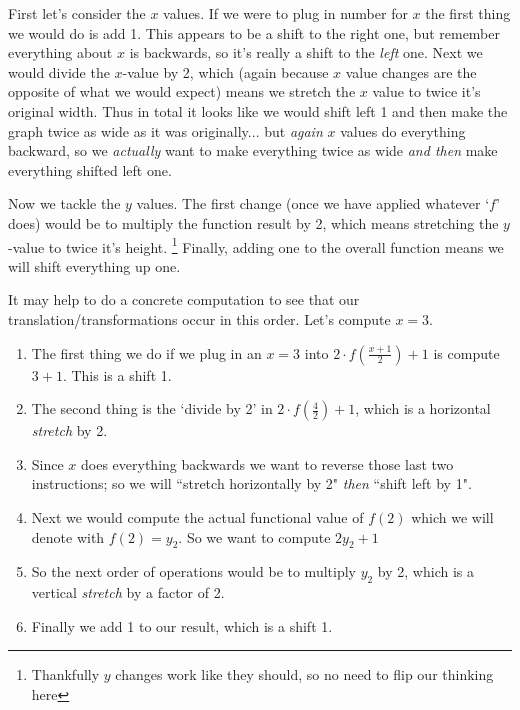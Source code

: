 \documentclass{ximeraXloud}
\begin{document}
    First let's consider the $x$ values. If we were to plug in number for $x$ the first thing we would do is add 1. This appears to be a shift to the right one, but remember everything about $x$ is backwards, so it's really a shift to the \textit{left} one. Next we would divide the $x$-value by 2, which (again because $x$ value changes are the opposite of what we would expect) means we stretch the $x$ value to twice it's original width. Thus in total it looks like we would shift left 1 and then make the graph twice as wide as it was originally... but \textit{again} $x$ values do everything backward, so we \textit{actually} want to make everything twice as wide \textit{and then} make everything shifted left one.
    
    Now we tackle the $y$ values. The first change (once we have applied whatever `$f$' does) would be to multiply the function result by 2, which means stretching the $y$-value to twice it's height.%
    \footnote{%
        Thankfully $y$ changes work like they should, so no need to flip our thinking here%
        }
    Finally, adding one to the overall function means we will shift everything up one. 
    
    It may help to do a concrete computation to see that our translation/transformations occur in this order. Let's compute $x = 3$.
    \begin{enumerate}
        \item The first thing we do if we plug in an $x = 3$ into $2 \cdot f\left(\frac{x+1}{2}\right) + 1$ is compute $3+1$. This is a shift  1.
        \item The second thing is the `divide by 2' in $2 \cdot f\left(\frac{4}{2}\right) + 1$, which is a horizontal \textit{stretch} by 2.
        \item Since $x$ does everything backwards we want to reverse those last two instructions; so we will ``stretch horizontally by 2" \textit{then} ``shift left by 1".
        \item Next we would compute the actual functional value of $f(2)$ which we will denote with $f(2) = y_2$. So we want to compute $2y_2+1$
        \item So the next order of operations would be to multiply $y_2$ by 2, which is a vertical \textit{stretch} by a factor of 2.
        \item Finally we add 1 to our result, which is a shift  1.
    \end{enumerate}
    
\end{document}
